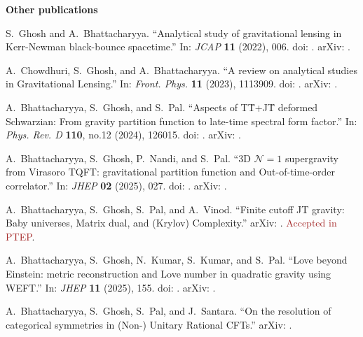 \vspace{0.45em}
\textbf{Other publications}
\begin{enumerate}[label={[\arabic*]},leftmargin=2.3em,itemsep=0.52em,resume]
  \item S.~Ghosh and A.~Bhattacharyya.
  ``Analytical study of gravitational lensing in Kerr-Newman black-bounce
  spacetime.'' In: \textit{JCAP} \textbf{11} (2022), 006.
  doi: .
  arXiv: .

  \item A.~Chowdhuri, S.~Ghosh, and A.~Bhattacharyya.
  ``A review on analytical studies in Gravitational Lensing.'' In:
  \textit{Front. Phys.} \textbf{11} (2023), 1113909.
  doi: .
  arXiv: .

  \item A.~Bhattacharyya, S.~Ghosh, and S.~Pal.
  ``Aspects of T\={T}+J\={T} deformed Schwarzian: From gravity partition
  function to late-time spectral form factor.'' In:
  \textit{Phys. Rev. D} \textbf{110}, no.12 (2024), 126015.
  doi: .
  arXiv: .

  \item A.~Bhattacharyya, S.~Ghosh, P.~Nandi, and S.~Pal.
  ``3D $\mathcal{N}=1$ supergravity from Virasoro TQFT: gravitational partition
  function and Out-of-time-order correlator.'' In:
  \textit{JHEP} \textbf{02} (2025), 027.
  doi: .
  arXiv: .

  \item A.~Bhattacharyya, S.~Ghosh, S.~Pal, and A.~Vinod.
  ``Finite cutoff JT gravity: Baby universes, Matrix dual, and (Krylov) Complexity.'' arXiv: . \textcolor{brown}{Accepted in PTEP}.

  \item A.~Bhattacharyya, S.~Ghosh, N.~Kumar, S.~Kumar, and S.~Pal.
  ``Love beyond Einstein: metric reconstruction and Love number in quadratic
  gravity using WEFT.'' In: \textit{JHEP} \textbf{11} (2025), 155.
  doi: .
  arXiv: .

  \item A.~Bhattacharyya, S.~Ghosh, S.~Pal, and J.~Santara.
  ``On the resolution of categorical symmetries in (Non-) Unitary Rational
  CFTs.'' arXiv: .
\end{enumerate}
